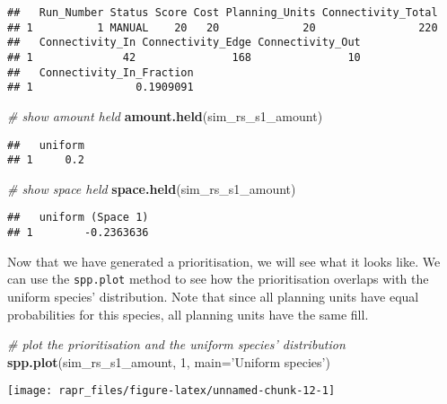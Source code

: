 \documentclass[11pt,]{article}
\newenvironment{Shaded}{\begin{snugshade}}{\end{snugshade}}
\newcommand{\KeywordTok}[1]{\textcolor[rgb]{0.13,0.29,0.53}{\textbf{{#1}}}}
\newcommand{\DataTypeTok}[1]{\textcolor[rgb]{0.13,0.29,0.53}{{#1}}}
\newcommand{\DecValTok}[1]{\textcolor[rgb]{0.00,0.00,0.81}{{#1}}}
\newcommand{\StringTok}[1]{\textcolor[rgb]{0.31,0.60,0.02}{{#1}}}
\newcommand{\CommentTok}[1]{\textcolor[rgb]{0.56,0.35,0.01}{\textit{{#1}}}}
\newcommand{\NormalTok}[1]{{#1}}
\let\origfigure\figure
\let\endorigfigure\endfigure
\renewenvironment{figure}[1][2] {
	\expandafter\origfigure\expandafter[H]
} {
	\endorigfigure
}
\begin{document}
\begin{verbatim}
##   Run_Number Status Score Cost Planning_Units Connectivity_Total
## 1          1 MANUAL    20   20             20                220
##   Connectivity_In Connectivity_Edge Connectivity_Out
## 1              42               168               10
##   Connectivity_In_Fraction
## 1                0.1909091
\end{verbatim}

\begin{Shaded}
\begin{Highlighting}[]
\CommentTok{# show amount held}
\KeywordTok{amount.held}\NormalTok{(sim_rs_s1_amount)}
\end{Highlighting}
\end{Shaded}

\begin{verbatim}
##   uniform
## 1     0.2
\end{verbatim}

\begin{Shaded}
\begin{Highlighting}[]
\CommentTok{# show space held}
\KeywordTok{space.held}\NormalTok{(sim_rs_s1_amount)}
\end{Highlighting}
\end{Shaded}

\begin{verbatim}
##   uniform (Space 1)
## 1        -0.2363636
\end{verbatim}

Now that we have generated a prioritisation, we will see what it looks
like. We can use the \texttt{spp.plot} method to see how the
prioritisation overlaps with the uniform species' distribution. Note
that since all planning units have equal probabilities for this species,
all planning units have the same fill.

\begin{Shaded}
\begin{Highlighting}[]
\CommentTok{# plot the prioritisation and the uniform species' distribution}
\KeywordTok{spp.plot}\NormalTok{(sim_rs_s1_amount, }\DecValTok{1}\NormalTok{, }\DataTypeTok{main=}\StringTok{'Uniform species'}\NormalTok{)}
\end{Highlighting}
\end{Shaded}

\begin{figure}

{\centering \texttt{[image: rapr\_files/figure-latex/unnamed-chunk-12-1]} 

}

\caption{A prioritisation for the uniformly distributed species generated using amount-based targets (20\%). Sqaures represent planning units. Planning units with a green border are selected for prioritisation, and their colour denotes the probability they are inhabited by the species.}\label{fig:unnamed-chunk-12}
\end{figure}
\end{document}
